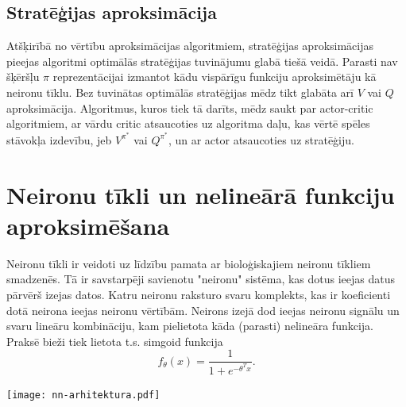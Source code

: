 \documentclass[a0,landscape]{a0poster}
\numberwithin{equation}{section}
\theoremstyle{definition}
\theoremstyle{plain}
\begin{document}
\begin{multicols}{4}
\subsection*{Stratēģijas aproksimācija}
Atšķirībā no vērtību aproksimācijas algoritmiem, stratēģijas aproksimācijas pieejas algoritmi optimālās stratēģijas tuvinājumu glabā tiešā veidā.
Parasti nav šķēršļu $\pi$ reprezentācijai izmantot kādu vispārīgu funkciju aproksimētāju kā neironu tīklu.
Bez tuvinātas optimālās stratēģijas mēdz tikt glabāta arī $V$ vai $Q$ aproksimācija.
Algoritmus, kuros tiek tā darīts, mēdz saukt par actor-critic algoritmiem, ar vārdu critic atsaucoties uz algoritma daļu, kas vērtē spēles stāvokļa izdevību, jeb $V^{\pi^*}$ vai $Q^{\pi^*}$, un ar actor atsaucoties uz stratēģiju.



\section*{Neironu tīkli un nelineārā funkciju aproksimēšana}
Neironu tīkli ir veidoti uz līdzību pamata ar bioloģiskajiem neironu tīkliem smadzenēs. Tā ir savstarpēji savienotu "neironu" sistēma, kas dotus ieejas datus pārvērš izejas datos.
Katru neironu raksturo svaru komplekts, kas ir koeficienti dotā neirona ieejas neironu vērtībām.
Neirons izejā dod ieejas neironu signālu un svaru lineāru kombināciju, kam pielietota kāda (parasti) nelineāra funkcija.
Praksē bieži tiek lietota t.s. simgoid funkcija
\[
	f_\theta(x) = \frac{1}{1 + e^{-\theta^T x}}.
\]


\begin{center}\vspace{1cm}
\texttt{[image: nn-arhitektura.pdf]}
\end{center}\vspace{1cm}


\end{multicols}
\end{document}

